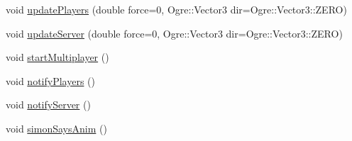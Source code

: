 \begin{DoxyCompactItemize}
void \hyperlink{classTileGame_a9b89da15c9725ec718bc294119841043}{update\-Players} (double force=0, Ogre\-::\-Vector3 dir=Ogre\-::\-Vector3\-::\-Z\-E\-R\-O)
\item 
void \hyperlink{classTileGame_ad4923a2d2eace2ebf9c9d38728c3e181}{update\-Server} (double force=0, Ogre\-::\-Vector3 dir=Ogre\-::\-Vector3\-::\-Z\-E\-R\-O)
\item 
void \hyperlink{classTileGame_a1ee23b22f33fa11b9bb4854d16d19653}{start\-Multiplayer} ()
\item 
void \hyperlink{classTileGame_a60decbb2167d26695a7eb7c50c7effa1}{notify\-Players} ()
\item 
void \hyperlink{classTileGame_a433bc18f76fb4c0b4465c638696ffe3c}{notify\-Server} ()
\item 
void \hyperlink{classTileGame_aabd8c2eb7913022c30119846d57eaba5}{simon\-Says\-Anim} ()
\end{DoxyCompactItemize}
